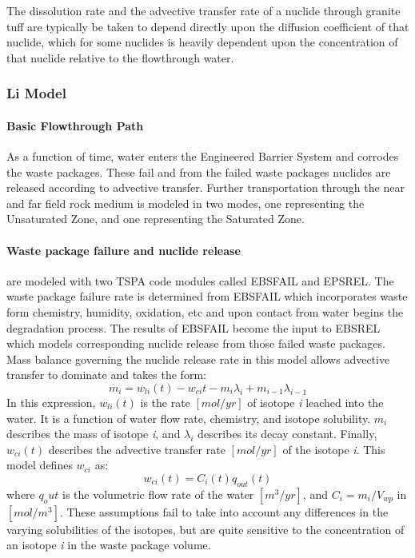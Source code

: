 The dissolution rate and the advective transfer rate of a nuclide 
through granite tuff are typically be taken to depend directly upon 
the diffusion coefficient of that nuclide, which for some nuclides is 
heavily dependent upon the concentration of that nuclide relative to 
the flowthrough water. 

\subsubsection{Li Model\cite{li_methodology_2006}}

\paragraph{Basic Flowthrough Path}
As a function of time, water enters the Engineered Barrier System and 
corrodes the waste packages.  These fail and from the failed waste 
packages nuclides are released according to advective transfer.  
Further transportation through the near and far field rock medium is 
modeled in two modes, one representing the Unsaturated Zone, and one 
representing the Saturated Zone.

\paragraph{Waste package failure and nuclide release} are modeled with 
two TSPA code modules called EBSFAIL and EPSREL. The waste package 
failure rate is determined from EBSFAIL which incorporates waste form 
chemistry, humidity, oxidation, etc and upon contact from water begins 
the degradation process. The results of EBSFAIL become the input to 
EBSREL which models corresponding nuclide release from those failed 
waste packages. Mass balance governing the nuclide release rate in 
this model allows advective transfer to dominate and takes the form:
\begin{equation}
\dot{m_i}=w_{li}(t)-w_{ci}{t}-m_i\lambda_i+m_{i-1}\lambda_{i-1}\nonumber
\end{equation}
In this expression, $w_{li}(t)$ is the rate $[mol/yr]$ of isotope 
\emph{i} leached into the water.  It is a function of water flow rate, 
chemistry, and isotope solubility. $m_i$ describes the mass of isotope 
\emph{i}, and $\lambda_i$ describes its decay constant. Finally, 
$w_{ci}(t)$ describes the advective transfer rate $[mol/yr]$ of the 
isotope \emph{i}. This model defines $w_{ci}$ as:
\begin{equation}
w_{ci}(t)=C_i(t)q_{out}(t)
\end{equation} where $q_out$ is the volumetric flow rate of the water 
$[m^3/yr]$, and $C_i = m_i/V_{wp}$ in $[mol/m^3]$. These assumptions 
fail to take into account any differences in the varying solubilities 
of the isotopes, but are quite sensitive to the concentration of an 
isotope \emph{i} in the waste package volume.  

